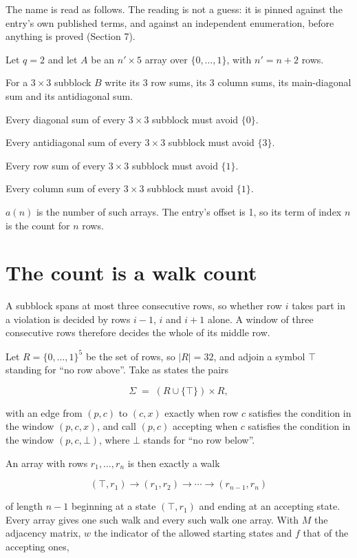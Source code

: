 \documentclass[11pt]{article}
\theoremstyle{definition}
\begin{document}
The name is read as follows. The reading is not a guess: it is pinned against the entry's own published terms, and against an independent enumeration, before anything is proved (Section 7).

Let $q = 2$ and let $A$ be an $n' \times 5$ array over $\{0,\dots,1\}$, with $n' = n + 2$ rows.

For a $3\times3$ subblock $B$ write its 3 row sums, its 3 column sums, its main-diagonal sum and its antidiagonal sum.

Every diagonal sum of every $3\times3$ subblock must avoid $\{0\}$.

Every antidiagonal sum of every $3\times3$ subblock must avoid $\{3\}$.

Every row sum of every $3\times3$ subblock must avoid $\{1\}$.

Every column sum of every $3\times3$ subblock must avoid $\{1\}$.

$a(n)$ is the number of such arrays. The entry's offset is 1, so its term of index $n$ is the count for $n$ rows.

\section{The count is a walk count}

A subblock spans at most three consecutive rows, so whether row $i$ takes part in a violation is decided by rows $i-1$, $i$ and $i+1$ alone. A window of three consecutive rows therefore decides the whole of its middle row.

Let $R = \{0,\dots,1\}^{5}$ be the set of rows, so $|R| = 32$, and adjoin a symbol $\top$ standing for ``no row above''. Take as states the pairs

\[\Sigma \;=\; (R \cup \{\top\}) \times R,\]

with an edge from $(p,c)$ to $(c,x)$ exactly when row $c$ satisfies the condition in the window $(p,c,x)$, and call $(p,c)$ accepting when $c$ satisfies the condition in the window $(p,c,\bot)$, where $\bot$ stands for ``no row below''.

An array with rows $r_1,\dots,r_n$ is then exactly a walk

\[(\top,r_1) \to (r_1,r_2) \to \cdots \to (r_{n-1},r_n)\]

of length $n-1$ beginning at a state $(\top,r_1)$ and ending at an accepting state. Every array gives one such walk and every such walk one array. With $M$ the adjacency matrix, $w$ the indicator of the allowed starting states and $f$ that of the accepting ones,
\end{document}
